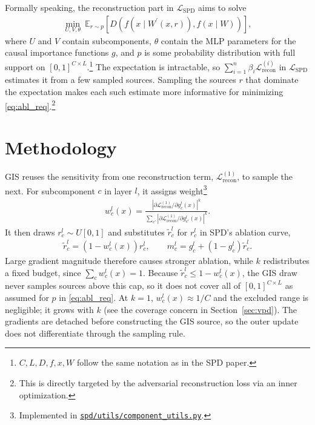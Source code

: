 \documentclass[11pt]{article}
\begin{document}
Formally speaking, the reconstruction part in $\mathcal{L}_{\text{SPD}}$ aims to solve
\begin{align} \label{eq:abl_req}
    \min_{U,V, \theta} \ \mathbb{E}_{r\sim p} \left[ D\left(f\left(x \mid W^{\prime}\left(x, r \right)\right), f(x \mid W)\right) \right],
\end{align}
where $U$ and $V$ contain subcomponents, $\theta$ contain the MLP parameters for the causal importance functions $g$, and $p$ is some probability distribution with full support on $[0,1]^{C \times L}$.\footnote{$C, L, D, f, x, W$ follow the same notation as in the SPD paper.}
The expectation is intractable, so $\sum_{i=1}^n \beta_i \mathcal{L}^{(i)}_{\text{recon}}$ in $\mathcal{L}_{\text{SPD}}$ estimates it from a few sampled sources. Sampling the sources $r$ that dominate the expectation makes each such estimate more informative for minimizing \eqref{eq:abl_req}.\footnote{This is directly targeted by the adversarial reconstruction loss via an inner optimization.}


\section{Methodology}
\label{sec:method}

GIS reuses the sensitivity from one reconstruction term,
$\mathcal L_{\mathrm{recon}}^{(1)}$, to sample the next. For subcomponent $c$ in layer $l$,
it assigns weight\footnote{Implemented in
\href{https://github.com/chandanms/spd/blob/feature/important-sampling/spd/utils/component_utils.py}{\texttt{spd/utils/component\_utils.py}}.}
\begin{align}
\label{eq:weights}
    w_c^l(x) =
    \frac{\left|\partial\mathcal L_{\mathrm{recon}}^{(1)}/\partial g_c^l(x)\right|^k}
    {\sum_{c'}\left|\partial\mathcal L_{\mathrm{recon}}^{(1)}/
    \partial g_{c'}^l(x)\right|^k}.
\end{align}
It then draws $r_c^l\sim U[0,1]$ and substitutes $\widetilde r_c^l$ for $r_c^l$ in SPD's
ablation curve,
\begin{align}
\label{eq:mask}
    \widetilde r_c^l=\left(1-w_c^l(x)\right)r_c^l,
    \qquad
    m_c^l=g_c^l+(1-g_c^l)\widetilde r_c^l.
\end{align}
Large gradient magnitude therefore causes stronger ablation, while $k$ redistributes a
fixed budget, since $\sum_c w_c^l(x)=1$. Because $\widetilde r_c^l\le 1-w_c^l(x)$, the
GIS draw never samples sources above this cap, so it does not cover all of
$[0,1]^{C\times L}$ as assumed for $p$ in \eqref{eq:abl_req}. At $k=1$,
$w_c^l(x)\approx 1/C$ and the excluded range is negligible; it grows with $k$ (see the
coverage concern in Section~\ref{sec:vpd}). The gradients are detached before constructing the GIS source,
so the outer update does not differentiate through the sampling rule.
\end{document}
